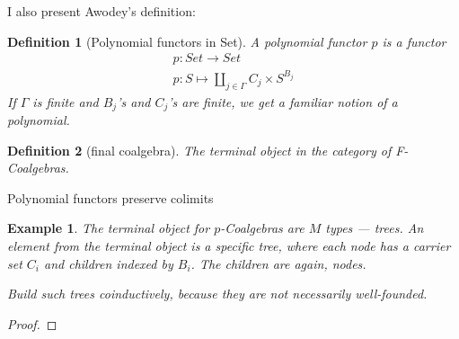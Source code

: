 \documentclass{article}
\newtheorem{definition}{Definition}[section]
\newtheorem{example}{Example}[section]
\begin{document}
    I also present Awodey's definition:
    \begin{definition}[Polynomial functors in Set]
        A polynomial functor \(p\) is a functor 
        \begin{align*}
            p:Set\to Set\\
            p:S\mapsto \coprod_{j\in\Gamma} C_j \times S^{B_j}
        \end{align*}
        If \(\Gamma\) is finite and \(B_j\)'s and \(C_j\)'s are finite, we get a familiar notion of a polynomial.
    \end{definition}
    
    \begin{definition}[final coalgebra]
        The terminal object in the category of F-Coalgebras.
    \end{definition}

    Polynomial functors preserve colimits

    \begin{example}
        The terminal object for \(p\)-Coalgebras are \(M\) types --- trees. An element from the terminal object is a specific tree, where each node has a carrier set \(C_i\) and children indexed by \(B_i\). The children are again, nodes.

        Build such trees coinductively, because they are not necessarily well-founded.
    \end{example}
    \begin{proof}

    \end{proof}
        
\end{document}

